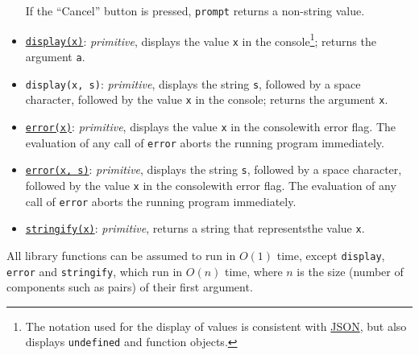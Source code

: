 \begin{itemize}
If the ``Cancel'' button is pressed, \texttt{prompt} returns a non-string value.
\item \href{https://source-academy.github.io/sicp/chapters/1.2.6.html\#footnote-7}{\texttt{display(x)}}: \textit{primitive}, displays the value \texttt{x} in the console\footnote{The notation used for the display of values is consistent with \href{http://www.ecma-international.org/publications/files/ECMA-ST/ECMA-404.pdf}{\color{DarkBlue}JSON}, but also displays \texttt{undefined} and function objects.}; returns the argument \texttt{a}.
\item \texttt{display(x, s)}: \textit{primitive}, displays the string \texttt{s}, followed by a space character, followed by the value \texttt{x} in the console\footnotemark[\value{footnote}]; returns the argument \texttt{x}.
\item \href{https://source-academy.github.io/sicp/chapters/1.2.6.html\#footnote-7}{\texttt{error(x)}}: \textit{primitive}, displays the value \texttt{x} in the console\footnotemark[\value{footnote}] with error flag. The evaluation
  of any call of \texttt{error} aborts the running program immediately.
\item \href{https://source-academy.github.io/sicp/chapters/2.1.3.html\#footnote-2}{\texttt{error(x, s)}}: \textit{primitive}, displays the string \texttt{s}, followed by a space character, followed by the value \texttt{x} in the console\footnotemark[\value{footnote}] with error flag. The evaluation
  of any call of \texttt{error} aborts the running program immediately.
\item \href{https://source-academy.github.io/sicp/chapters/3.3.4.html\#p24}{\lstinline{stringify(x)}}: \textit{primitive}, returns a string that represents\footnotemark[\value{footnote}] the value \texttt{x}. 
\end{itemize}
All library functions can be assumed to run
in $O(1)$ time, except \texttt{display}, \texttt{error} and \texttt{stringify}, 
which run in $O(n)$ time, where $n$ is
the size (number of components such as pairs) of their first argument.
